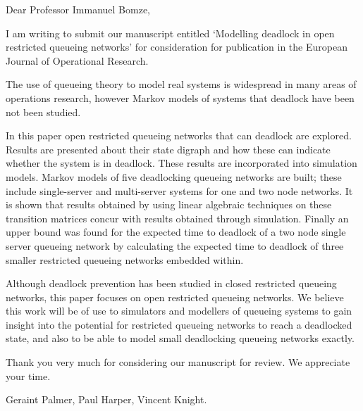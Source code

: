 \documentclass{article}
\begin{document}
Dear Professor Immanuel Bomze,

I am writing to submit our manuscript entitled `Modelling deadlock in open restricted queueing networks' for consideration for publication in the European Journal of Operational Research.

The use of queueing theory to model real systems is widespread in many areas of operations research, however Markov models of systems that deadlock have been not been studied.

In this paper open restricted queueing networks that can deadlock are explored. Results are presented about their state digraph and how these can indicate whether the system is in deadlock. These results are incorporated into simulation models. Markov models of five deadlocking queueing networks are built; these include single-server and multi-server systems for one and two node networks. It is shown that results obtained by using linear algebraic techniques on these transition matrices concur with results obtained through simulation. Finally an upper bound was found for the expected time to deadlock of a two node single server queueing network by calculating the expected time to deadlock of three smaller restricted queueing networks embedded within.

Although deadlock prevention has been studied in closed restricted queueing networks, this paper focuses on open restricted queueing networks. We believe this work will be of use to simulators and modellers of queueing systems to gain insight into the potential for restricted queueing networks to reach a deadlocked state, and also to be able to model small deadlocking queueing networks exactly.

Thank you very much for considering our manuscript for review. We appreciate your time.

Geraint Palmer, Paul Harper, Vincent Knight.
\end{document}
